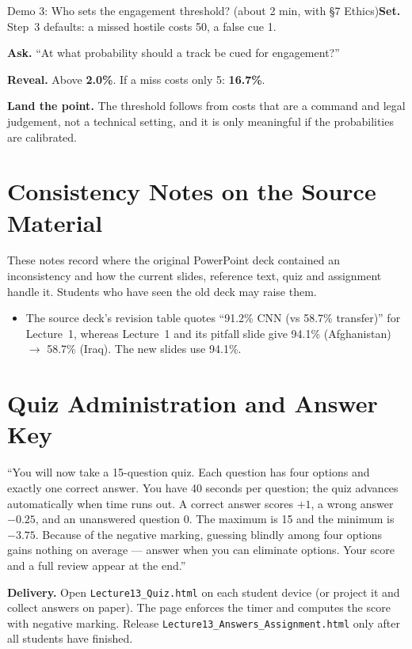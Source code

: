 \documentclass[11pt]{article}
\begin{document}
\begin{live}{Demo 3: Who sets the engagement threshold? (about 2 min, with \S7 Ethics)}\textbf{Set.} Step~3 defaults: a missed hostile costs 50, a false cue 1.\par\smallskip\textbf{Ask.} ``At what probability should a track be cued for engagement?''\par\smallskip\textbf{Reveal.} Above \textbf{2.0\%}. If a miss costs only 5: \textbf{16.7\%}.\par\smallskip\textbf{Land the point.} The threshold follows from costs that are a command and legal judgement, not a technical setting, and it is only meaningful if the probabilities are calibrated.\end{live}

\section{Consistency Notes on the Source Material}These notes record where the original PowerPoint deck contained an inconsistency and how the current slides, reference text, quiz and assignment handle it. Students who have seen the old deck may raise them.\begin{itemize}\item The source deck's revision table quotes ``91.2\% CNN (vs 58.7\% transfer)'' for Lecture~1, whereas Lecture~1 and its pitfall slide give 94.1\% (Afghanistan) $\to$ 58.7\% (Iraq). The new slides use 94.1\%.\end{itemize}

\section{Quiz Administration and Answer Key}

\begin{sayit}``You will now take a 15-question quiz. Each question has four options and exactly one correct answer. You have 40 seconds per question; the quiz advances automatically when time runs out. A correct answer scores $+1$, a wrong answer $-0.25$, and an unanswered question 0. The maximum is 15 and the minimum is $-3.75$. Because of the negative marking, guessing blindly among four options gains nothing on average --- answer when you can eliminate options. Your score and a full review appear at the end.''\end{sayit}

\textbf{Delivery.} Open \texttt{Lecture13\_Quiz.html} on each student device (or project it and collect answers on paper). The page enforces the timer and computes the score with negative marking. Release \texttt{Lecture13\_Answers\_Assignment.html} only after all students have finished.
\end{document}
